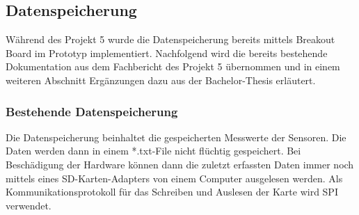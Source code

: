 \subsection{Datenspeicherung}
\label{subsec:Datenspeicherung}
Während des Projekt 5 wurde die Datenspeicherung bereits mittels Breakout Board im Prototyp implementiert. Nachfolgend wird die bereits bestehende Dokumentation aus dem Fachbericht des Projekt 5 übernommen und in einem weiteren Abschnitt Ergänzungen dazu aus der Bachelor-Thesis erläutert.

\subsubsection{Bestehende Datenspeicherung}
Die Datenspeicherung beinhaltet die gespeicherten Messwerte der Sensoren. Die Daten werden dann in einem *.txt-File nicht flüchtig gespeichert. Bei Beschädigung der Hardware können dann die zuletzt erfassten Daten immer noch mittels eines SD-Karten-Adapters von einem Computer ausgelesen werden. Als Kommunikationsprotokoll für das Schreiben und Auslesen der Karte wird SPI verwendet.

